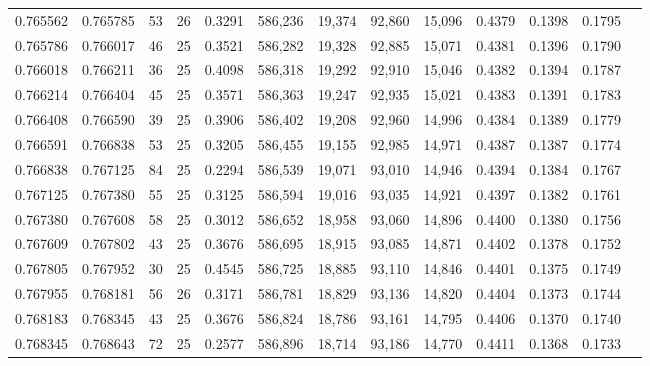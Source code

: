 \begin{tabular}{rrrrrrrrrrrrr}
0.765562 & 0.765785 &    53 &  26 &                                     0.3291 & 586,236 &  19,374 &  92,860 &  15,096 & 0.4379 & 0.1398 & 0.1795 \\
0.765786 & 0.766017 &    46 &  25 &                                     0.3521 & 586,282 &  19,328 &  92,885 &  15,071 & 0.4381 & 0.1396 & 0.1790 \\
0.766018 & 0.766211 &    36 &  25 &                                     0.4098 & 586,318 &  19,292 &  92,910 &  15,046 & 0.4382 & 0.1394 & 0.1787 \\
0.766214 & 0.766404 &    45 &  25 &                                     0.3571 & 586,363 &  19,247 &  92,935 &  15,021 & 0.4383 & 0.1391 & 0.1783 \\
0.766408 & 0.766590 &    39 &  25 &                                     0.3906 & 586,402 &  19,208 &  92,960 &  14,996 & 0.4384 & 0.1389 & 0.1779 \\
0.766591 & 0.766838 &    53 &  25 &                                     0.3205 & 586,455 &  19,155 &  92,985 &  14,971 & 0.4387 & 0.1387 & 0.1774 \\
0.766838 & 0.767125 &    84 &  25 &                                     0.2294 & 586,539 &  19,071 &  93,010 &  14,946 & 0.4394 & 0.1384 & 0.1767 \\
0.767125 & 0.767380 &    55 &  25 &                                     0.3125 & 586,594 &  19,016 &  93,035 &  14,921 & 0.4397 & 0.1382 & 0.1761 \\
0.767380 & 0.767608 &    58 &  25 &                                     0.3012 & 586,652 &  18,958 &  93,060 &  14,896 & 0.4400 & 0.1380 & 0.1756 \\
0.767609 & 0.767802 &    43 &  25 &                                     0.3676 & 586,695 &  18,915 &  93,085 &  14,871 & 0.4402 & 0.1378 & 0.1752 \\
0.767805 & 0.767952 &    30 &  25 &                                     0.4545 & 586,725 &  18,885 &  93,110 &  14,846 & 0.4401 & 0.1375 & 0.1749 \\
0.767955 & 0.768181 &    56 &  26 &                                     0.3171 & 586,781 &  18,829 &  93,136 &  14,820 & 0.4404 & 0.1373 & 0.1744 \\
0.768183 & 0.768345 &    43 &  25 &                                     0.3676 & 586,824 &  18,786 &  93,161 &  14,795 & 0.4406 & 0.1370 & 0.1740 \\
0.768345 & 0.768643 &    72 &  25 &                                     0.2577 & 586,896 &  18,714 &  93,186 &  14,770 & 0.4411 & 0.1368 & 0.1733 \\

\end{tabular}
